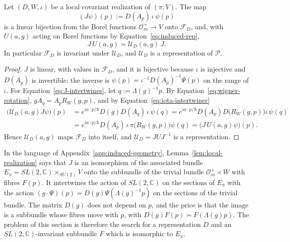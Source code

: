 	\begin{lemma}\label{lem:local-realization}
		Let $(D,W,\iota)$ be a local covariant realization of $(\pi,V)$. The map
		\begin{equation*}
			(J\psi)(p):=D(A_p)\,\iota\,\psi(p)
		\end{equation*}
		is a linear bijection from the Borel functions $\mathcal{O}_m^+\to V$ onto $\mathcal{F}_D$, and, with $U(a,g)$ acting on Borel functions by Equation~\eqref{eq:induced-rep},
		\begin{equation}\label{eq:J-intertwines}
			J\,U(a,g)=\mathcal{U}_D(a,g)\,J.
		\end{equation}
		In particular $\mathcal{F}_D$ is invariant under $\mathcal{U}_D$, and $\mathcal{U}_D$ is a representation of $\mathcal{P}$.
	\end{lemma}
	
	\begin{proof}
		$J$ is linear, with values in $\mathcal{F}_D$, and it is bijective because $\iota$ is injective and $D(A_p)$ is invertible: the inverse is $\psi(p)=\iota^{-1}D(A_p)^{-1}\Psi(p)$ on the range of $\iota$. For Equation~\eqref{eq:J-intertwines}, let $q:=\Lambda(g)^{-1}p$. By Equation~\eqref{eq:wigner-rotation}, $gA_q=A_pR_W(g,p)$, and by Equation~\eqref{eq:iota-intertwiner}
		\begin{align*}
			\big(\mathcal{U}_D(a,g)J\psi\big)(p)&=e^{ia\cdot p/\hbar}D(g)D(A_q)\,\iota\,\psi(q)=e^{ia\cdot p/\hbar}D(A_p)D\big(R_W(g,p)\big)\iota\,\psi(q)\\
			&=e^{ia\cdot p/\hbar}D(A_p)\,\iota\,\pi\big(R_W(g,p)\big)\psi(q)=\big(J\,U(a,g)\psi\big)(p).
		\end{align*}
		Hence $\mathcal{U}_D(a,g)$ maps $\mathcal{F}_D$ into itself, and $\mathcal{U}_D=JUJ^{-1}$ is a representation.
	\end{proof}
	
	\begin{remark}\label{rem:local-subbundle}
		In the language of Appendix~\ref{app:induced-geometry}, Lemma~\ref{lem:local-realization} says that $J$ is an isomorphism of the associated bundle $E_\pi=SL(2,\mathbb{C})\times_{SU(2)}V$ onto the subbundle of the trivial bundle $\mathcal{O}_m^+\times W$ with fibres $F(p)$. It intertwines the action of $SL(2,\mathbb{C})$ on the sections of $E_\pi$ with the action $(g\cdot\Psi)(p)=D(g)\Psi(\Lambda(g)^{-1}p)$ on the sections of the trivial bundle. The matrix $D(g)$ does not depend on $p$, and the price is that the image is a subbundle whose fibres move with $p$, with $D(g)F(p)=F(\Lambda(g)p)$. The problem of this section is therefore the search for a representation $D$ and an $SL(2,\mathbb{C})$-invariant subbundle $F$ which is isomorphic to $E_\pi$.
	\end{remark}
	

